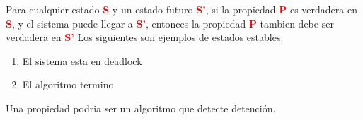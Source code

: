 Para cualquier estado \textcolor{red}{\textbf{S}} y un estado futuro \textcolor{red}{\textbf{S'}}, si la propiedad \textcolor{red}{\textbf{P}} es verdadera en \textcolor{red}{\textbf{S}}, y el sistema puede llegar a \textcolor{red}{\textbf{S'}}, entonces la propiedad \textcolor{red}{\textbf{P}} tambien debe ser verdadera en \textcolor{red}{\textbf{S'}}
Los siguientes son ejemplos de estados estables:
\begin{enumerate}
  \item El sistema esta en deadlock
  \item El algoritmo termino
\end{enumerate}
Una propiedad podria ser un algoritmo que detecte detención.